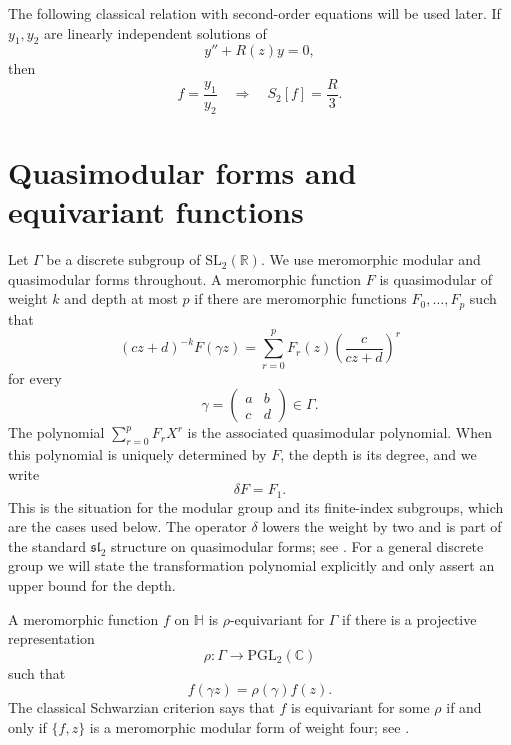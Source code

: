 \documentclass[11pt]{amsart}
\theoremstyle{definition}
\theoremstyle{remark}
\numberwithin{equation}{section}
\begin{document}
The following classical relation with second-order equations will be used later. If $y_1,y_2$ are linearly independent solutions of
\begin{equation*}
y''+R(z)y=0,
\end{equation*}
then
\begin{equation*}
f=\frac{y_1}{y_2}
\quad\Longrightarrow\quad
S_2[f]=\frac{R}{3}.
\end{equation*}

\section{Quasimodular forms and equivariant functions}

Let $\Gamma$ be a discrete subgroup of $\mathrm{SL}_2(\mathbb R)$. We use meromorphic modular and quasimodular forms throughout. A meromorphic function $F$ is quasimodular of weight $k$ and depth at most $p$ if there are meromorphic functions $F_0,\ldots,F_p$ such that
\begin{equation}\label{eq:qm}
(cz+d)^{-k}F(\gamma z)
=
\sum_{r=0}^{p}F_r(z)
\left(\frac{c}{cz+d}\right)^r
\end{equation}
for every
\[
\gamma=\begin{pmatrix}a&b\\c&d\end{pmatrix}\in\Gamma.
\]
The polynomial $\sum_{r=0}^pF_rX^r$ is the associated quasimodular polynomial. When this polynomial is uniquely determined by $F$, the depth is its degree, and we write
\[
\delta F=F_1.
\]
This is the situation for the modular group and its finite-index subgroups, which are the cases used below. The operator $\delta$ lowers the weight by two and is part of the standard $\mathfrak{sl}_2$ structure on quasimodular forms; see \cite{ka-za,royer,123}. For a general discrete group we will state the transformation polynomial explicitly and only assert an upper bound for the depth.

A meromorphic function $f$ on $\mathbb H$ is $\rho$-equivariant for $\Gamma$ if there is a projective representation
\[
\rho:\Gamma\longrightarrow\mathrm{PGL}_2(\mathbb C)
\]
such that
\[
f(\gamma z)=\rho(\gamma)f(z).
\]
The classical Schwarzian criterion says that $f$ is equivariant for some $\rho$ if and only if $\{f,z\}$ is a meromorphic modular form of weight four; see \cite{mathann,forum}.
\end{document}
